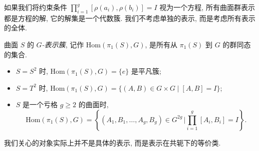 如果我们将约束条件 $\prod_{i=1}^g [\rho(a_i),\rho(b_i)] = I$ 视为一个方程, 所有曲面群表示都是方程的解, 它的解集是一个代数簇.
我们不考虑单独的表示, 而是考虑所有表示的全体.
\begin{definition}
    曲面 $S$ 的 \emph{$G$-表示簇}, 记作 $\mathrm{Hom}(\pi_1(S),G)$, 是所有从 $\pi_1(S)$ 到 $G$ 的群同态的集合.
\end{definition} 
\begin{example}\hfill
    \begin{itemize}[leftmargin=*]
        \item $S = S^2$ 时, $\mathrm{Hom}(\pi_1(S),G) = \{e\}$ 是平凡簇;
        \item $S = T^2$ 时, $\mathrm{Hom}(\pi_1(S),G) = \{(A,B)\in G\times G \mid [A,B] = I\}$;
        \item $S$ 是一个亏格 $g\geq 2$ 的曲面时, 
        \begin{equation*}
            \mathrm{Hom}(\pi_1(S),G) = \left\{(A_1,B_1,\ldots,A_g,B_g)\in G^{2g}\, \Bigg| \prod_{i=1}^g [A_i,B_i] = I\right\}.
        \end{equation*}
    \end{itemize}
\end{example}
\begin{remark}
    我们关心的对象实际上并不是具体的表示, 而是表示在共轭下的等价类. 
\end{remark}